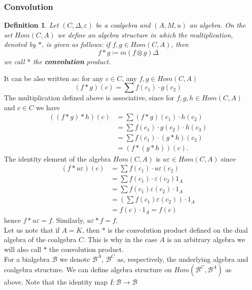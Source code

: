 \documentclass[a4paper, 12pt]{article}
\newtheorem{definition}{Definition}
\begin{document}
\subsubsection{Convolution}
\begin{definition}
Let $(C, \Delta, \varepsilon)$ be a coalgebra and $(A, M, u)$ an algebra. On the set $Hom(C, A)$ we define
an algebra structure in which the multiplication, denoted by $*$, is given as follows: if
$f, g \in Hom(C, A)$, then
\begin{equation*}
f*g \coloneqq m(f \otimes g)\Delta
\end{equation*}
we call $*$ the \textbf{convolution} product.
\end{definition}
It can be also written as: for any $c \in C$, any $f, g \in Hom(C, A)$
\begin{equation*}
(f*g)(c) = \sum f(c_1) \cdot g(c_2)
\end{equation*}
The multiplication defined above is associative, since for $f, g, h \in Hom(C, A)$ and
$c \in C$ we have
\begin{align*}
((f*g)*h)(c) &= \sum(f*g)(c_1)\cdot h(c_2) \\
&= \sum f(c_1) \cdot g(c_2) \cdot h(c_3) \\
&= \sum f(c_1) \cdot (g*h)(c_2) \\
&= (f*(g*h))(c).
\end{align*}
The identity element of the algebra $Hom(C, A)$ is $u\varepsilon \in Hom(C, A)$ since
\begin{align*}
(f * u\varepsilon)(c) &= \sum f(c_1) \cdot u\varepsilon(c_2) \\
&= \sum f(c_1) \cdot \varepsilon(c_2)1_A \\
&= \sum f(c_1)\varepsilon(c_2) \cdot 1_A \\
&= \left(\sum f(c_1)\varepsilon(c_2)\right)\cdot 1_A \\
&= f(c) \cdot 1_A = f(c)
\end{align*}
hence $f * u\varepsilon = f$. Similarly, $u\varepsilon * f = f$. \\
Let us note that if $A = K$, then $*$ is the convolution product defined on the dual algebra of the
coalgebra $C$. This is why in the case $A$ is an arbitrary algebra we will also call $*$ the convolution
product. \\[8pt]
\indent For a bialgebra $\mathcal{B}$ we denote $\mathcal{B}^A$, $\mathcal{B}^C$ as, respectively,
the underlying algebra and coalgebra structure. We can define algebra structure on
$Hom(\mathcal{B}^C, \mathcal{B}^A)$ as above. Note that the identity map $I : \mathcal{B} \to \mathcal{B}$
\end{document}
